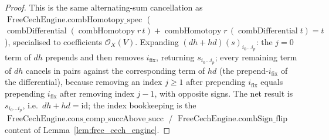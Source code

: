\begin{proof}
  This is the same alternating-sum cancellation as
  \(\operatorname{FreeCechEngine.combHomotopy\_spec}\)
  (\(\operatorname{combDifferential}(\operatorname{combHomotopy} r\, t) +
  \operatorname{combHomotopy} r\, (\operatorname{combDifferential} t) = t\)),
  specialised to coefficients \(\mathcal{O}_X(V)\). Expanding
  \((dh + hd)(s)_{i_0 \ldots i_p}\): the \(j = 0\) term of \(dh\) prepends and then
  removes \(i_{\mathrm{fix}}\), returning \(s_{i_0 \ldots i_p}\); every remaining term
  of \(dh\) cancels in pairs against the corresponding term of \(hd\) (the
  prepend-\(i_{\mathrm{fix}}\) of the differential), because removing an index
  \(j \geq 1\) after prepending \(i_{\mathrm{fix}}\) equals prepending
  \(i_{\mathrm{fix}}\) after removing index \(j-1\), with opposite signs. The net
  result is \(s_{i_0 \ldots i_p}\), i.e.\ \(dh + hd = \mathrm{id}\); the index
  bookkeeping is the \(\operatorname{FreeCechEngine.cons\_comp\_succAbove\_succ}\) /
  \(\operatorname{FreeCechEngine.combSign\_flip}\) content of
  Lemma~\ref{lem:free_cech_engine}.
\end{proof}

